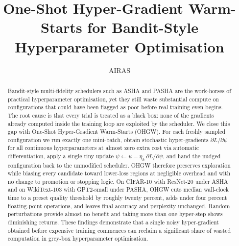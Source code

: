 \documentclass{article}
\title{One-Shot Hyper-Gradient Warm-Starts for Bandit-Style Hyperparameter Optimisation}
\author{AIRAS}
\begin{document}
\maketitle

\begin{abstract}
Bandit-style multi-fidelity schedulers such as ASHA and PASHA are the work-horses of practical hyperparameter optimisation, yet they still waste substantial compute on configurations that could have been flagged as poor before real training even begins. The root cause is that every trial is treated as a black box: none of the gradients already computed inside the training loop are exploited by the scheduler. We close this gap with One-Shot Hyper-Gradient Warm-Starts (OHGW). For each freshly sampled configuration we run exactly one mini-batch, obtain stochastic hyper-gradients $\partial L/\partial \psi$ for all continuous hyperparameters at almost zero extra cost via automatic differentiation, apply a single tiny update $\psi \leftarrow \psi - \eta_h\, \partial L/\partial \psi$, and hand the nudged configuration back to the unmodified scheduler. OHGW therefore preserves exploration while biasing every candidate toward lower-loss regions at negligible overhead and with no change to promotion or stopping logic. On CIFAR-10 with ResNet-20 under ASHA and on WikiText-103 with GPT2-small under PASHA, OHGW cuts median wall-clock time to a preset quality threshold by roughly twenty percent, adds under four percent floating-point operations, and leaves final accuracy and perplexity unchanged. Random perturbations provide almost no benefit and taking more than one hyper-step shows diminishing returns. These findings demonstrate that a single noisy hyper-gradient obtained before expensive training commences can reclaim a significant share of wasted computation in grey-box hyperparameter optimisation.
\end{abstract}
\end{document}
